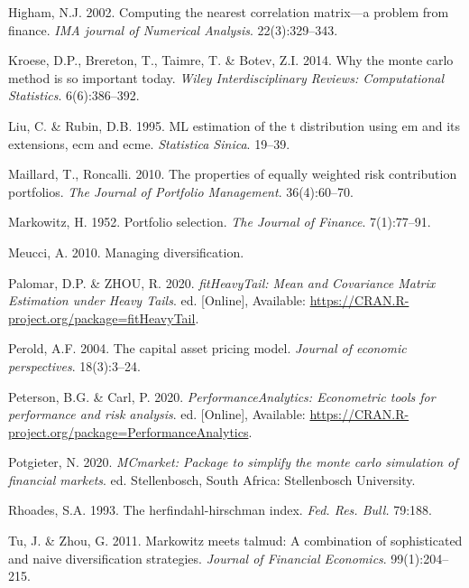 \documentclass[11pt,preprint, authoryear]{elsarticle}
\numberwithin{equation}{section}
\numberwithin{figure}{section}
\numberwithin{table}{section}
\begin{document}
\leavevmode\hypertarget{ref-higham2002}{}%
Higham, N.J. 2002. Computing the nearest correlation matrix---a problem
from finance. \emph{IMA journal of Numerical Analysis}. 22(3):329--343.

\leavevmode\hypertarget{ref-kroese2014}{}%
Kroese, D.P., Brereton, T., Taimre, T. \& Botev, Z.I. 2014. Why the
monte carlo method is so important today. \emph{Wiley Interdisciplinary
Reviews: Computational Statistics}. 6(6):386--392.

\leavevmode\hypertarget{ref-liu1995}{}%
Liu, C. \& Rubin, D.B. 1995. ML estimation of the t distribution using
em and its extensions, ecm and ecme. \emph{Statistica Sinica}. 19--39.

\leavevmode\hypertarget{ref-maillard2010}{}%
Maillard, T., Roncalli. 2010. The properties of equally weighted risk
contribution portfolios. \emph{The Journal of Portfolio Management}.
36(4):60--70.

\leavevmode\hypertarget{ref-markowitz}{}%
Markowitz, H. 1952. Portfolio selection. \emph{The Journal of Finance}.
7(1):77--91.

\leavevmode\hypertarget{ref-meucci2010}{}%
Meucci, A. 2010. Managing diversification.

\leavevmode\hypertarget{ref-fitHeavyTail}{}%
Palomar, D.P. \& ZHOU, R. 2020. \emph{fitHeavyTail: Mean and Covariance
Matrix Estimation under Heavy Tails}. ed. {[}Online{]}, Available:
\url{https://CRAN.R-project.org/package=fitHeavyTail}.

\leavevmode\hypertarget{ref-perold2004}{}%
Perold, A.F. 2004. The capital asset pricing model. \emph{Journal of
economic perspectives}. 18(3):3--24.

\leavevmode\hypertarget{ref-PerformanceAnalytics}{}%
Peterson, B.G. \& Carl, P. 2020. \emph{PerformanceAnalytics: Econometric
tools for performance and risk analysis}. ed. {[}Online{]}, Available:
\url{https://CRAN.R-project.org/package=PerformanceAnalytics}.

\leavevmode\hypertarget{ref-MCmarket}{}%
Potgieter, N. 2020. \emph{MCmarket: Package to simplify the monte carlo
simulation of financial markets}. ed. Stellenbosch, South Africa:
Stellenbosch University.

\leavevmode\hypertarget{ref-rhoades1993}{}%
Rhoades, S.A. 1993. The herfindahl-hirschman index. \emph{Fed. Res.
Bull.} 79:188.

\leavevmode\hypertarget{ref-tu2011}{}%
Tu, J. \& Zhou, G. 2011. Markowitz meets talmud: A combination of
sophisticated and naive diversification strategies. \emph{Journal of
Financial Economics}. 99(1):204--215.
\end{document}
